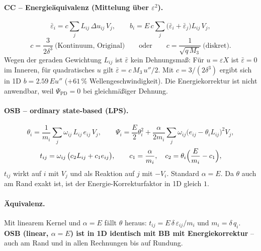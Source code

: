 \documentclass[a4paper,11pt]{article}
\begin{document}
\paragraph{CC -- Energieäquivalenz (Mittelung über $\varepsilon^2$).}
\[
  \bar\varepsilon_i = c \sum_j L_{ij}\,\Delta u_{ij}\,V_j ,\qquad
  b_i = E\,c \sum_j \bigl(\bar\varepsilon_i+\bar\varepsilon_j\bigr) L_{ij}\,V_j ,
\]
\[
  c = \frac{3}{2\delta^3}\ \text{(Kontinuum, Original)}\qquad\text{oder}\qquad
  c = \frac{1}{\sqrt{q\,M_3}}\ \text{(diskret)}.
\]
Wegen der geraden Gewichtung $L_{ij}$ ist $\bar\varepsilon$ kein Dehnungsmaß: Für $u = \varepsilon X$ ist
$\bar\varepsilon = 0$ im Inneren, für quadratisches $u$ gilt $\bar\varepsilon = c\,M_3\,u''/2$.
Mit $c = 3/(2\delta^3)$ ergibt sich in 1D $b = 2.59\,E u''$ ($+61\,\%$ Wellengeschwindigkeit).
Die Energiekorrektur ist nicht anwendbar, weil $\Psi_\mathrm{PD} = 0$ bei gleichmäßiger Dehnung.

\paragraph{OSB -- ordinary state-based (LPS).}
\[
  \theta_i = \frac{1}{m_i}\sum_j \omega_{ij}\, L_{ij}\, e_{ij}\,V_j ,\qquad
  \Psi_i = \frac{E}{2}\theta_i^2 + \frac{\alpha}{2m_i}\sum_j \omega_{ij}\bigl(e_{ij} - \theta_i L_{ij}\bigr)^2 V_j ,
\]
\[
  t_{ij} = \omega_{ij}\,\bigl(c_2 L_{ij} + c_1 e_{ij}\bigr),\qquad c_1 = \frac{\alpha}{m_i},\quad
  c_2 = \theta_i\Bigl(\frac{E}{m_i} - c_1\Bigr),
\]
$t_{ij}$ wirkt auf $i$ mit $V_j$ und als Reaktion auf $j$ mit $-V_i$. Standard $\alpha = E$.
Da $\theta$ auch am Rand exakt ist, ist der Energie-Korrekturfaktor in 1D gleich $1$.

\paragraph{Äquivalenz.} Mit linearem Kernel und $\alpha = E$ fällt $\theta$ heraus:
$t_{ij} = E\,\delta\,\varepsilon_{ij}/m_i$ und $m_i = \delta\,q_i$. \textbf{OSB (linear, $\alpha=E$) ist in 1D
identisch mit BB mit Energiekorrektur} -- auch am Rand und in allen Rechnungen bis auf Rundung.
\end{document}
